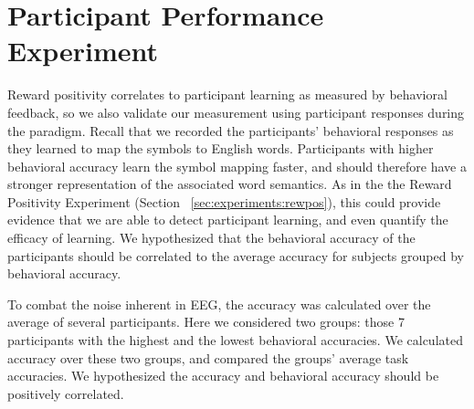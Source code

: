 \section{Participant Performance Experiment}
Reward positivity correlates to participant learning as measured by behavioral feedback, so we also validate our measurement using participant responses during the paradigm. Recall that we recorded the participants' behavioral responses as they learned to map the symbols to English words. Participants with higher behavioral accuracy learn the symbol mapping faster, and should therefore have a stronger representation of the associated word semantics. As in the the Reward Positivity Experiment (Section ~\ref{sec:experiments:rewpos}), this could provide evidence that we are able to detect participant learning, and even quantify the efficacy of learning. We hypothesized that the behavioral accuracy of the participants should be correlated to the average \tvt accuracy for subjects grouped by behavioral accuracy.

To combat the noise inherent in EEG, the \tvt accuracy was calculated over the average of several participants. Here we considered two groups: those 7 participants with the highest and the lowest behavioral accuracies. We calculated \tvt accuracy over these two groups, and compared the groups' average task accuracies. We hypothesized the \tvt accuracy and behavioral accuracy should be positively correlated.
